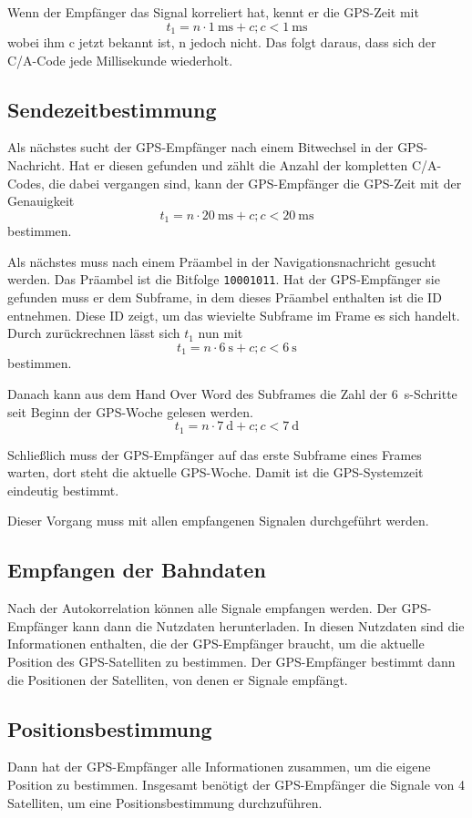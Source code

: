 \documentclass[12pt,a4paper]{scrartcl}
\begin{document}
Wenn der Empfänger das Signal korreliert hat, kennt er die GPS-Zeit mit $$t_1 = n\cdot\SI{1}{\milli\second} + c; c<\SI{1}{\milli\second}$$ wobei ihm c jetzt bekannt ist, n jedoch nicht. Das folgt daraus, dass sich der C/A-Code jede Millisekunde wiederholt.

\subsection{Sendezeitbestimmung}
Als nächstes sucht der GPS-Empfänger nach einem Bitwechsel in der GPS-Nachricht. Hat er diesen gefunden und zählt die Anzahl der kompletten C/A-Codes, die dabei vergangen sind, kann der GPS-Empfänger die GPS-Zeit mit der Genauigkeit  $$t_1 = n\cdot\SI{20}{\milli\second} + c; c<\SI{20}{\milli\second}$$ bestimmen.

Als nächstes muss nach einem Präambel in der Navigationsnachricht gesucht werden. Das Präambel ist die Bitfolge \texttt{10001011}. Hat der GPS-Empfänger sie gefunden muss er dem Subframe, in dem dieses Präambel enthalten ist die ID entnehmen. Diese ID zeigt, um das wievielte Subframe im Frame es sich handelt. Durch zurückrechnen lässt sich $t_1$ nun mit $$t_1 = n\cdot\SI{6}{\second} + c; c<\SI{6}{\second}$$ bestimmen.

Danach kann aus dem Hand Over Word des Subframes die Zahl der \SI{6}{\second}-Schritte seit Beginn der GPS-Woche gelesen werden. $$t_1 = n\cdot\SI{7}{\day} + c; c<\SI{7}{\day}$$

Schließlich muss der GPS-Empfänger auf das erste Subframe eines Frames warten, dort steht die aktuelle GPS-Woche. Damit ist die GPS-Systemzeit eindeutig bestimmt.

Dieser Vorgang muss mit allen empfangenen Signalen durchgeführt werden.

\subsection{Empfangen der Bahndaten}
Nach der Autokorrelation können alle Signale empfangen werden. Der GPS-Empfänger kann dann die Nutzdaten herunterladen. In diesen Nutzdaten sind die Informationen enthalten, die der GPS-Empfänger braucht, um die aktuelle Position des GPS-Satelliten zu bestimmen. Der GPS-Empfänger bestimmt dann die Positionen der Satelliten, von denen er Signale empfängt.

\subsection{Positionsbestimmung}
\label{sec:positioning}
Dann hat der GPS-Empfänger alle Informationen zusammen, um die eigene Position zu bestimmen. Insgesamt benötigt der GPS-Empfänger die Signale von 4 Satelliten, um eine Positionsbestimmung durchzuführen.
\end{document}
